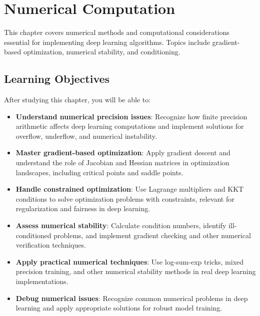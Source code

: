 
\chapter{Numerical Computation}
\label{chap:numerical-computation}

This chapter covers numerical methods and computational considerations essential for implementing deep learning algorithms. Topics include gradient-based optimization, numerical stability, and conditioning.

\section*{Learning Objectives}

After studying this chapter, you will be able to:

\begin{itemize}
    \item \textbf{Understand numerical precision issues}: Recognize how finite precision arithmetic affects deep learning computations and implement solutions for overflow, underflow, and numerical instability.
    
    \item \textbf{Master gradient-based optimization}: Apply gradient descent and understand the role of Jacobian and Hessian matrices in optimization landscapes, including critical points and saddle points.
    
    \item \textbf{Handle constrained optimization}: Use Lagrange multipliers and KKT conditions to solve optimization problems with constraints, relevant for regularization and fairness in deep learning.
    
    \item \textbf{Assess numerical stability}: Calculate condition numbers, identify ill-conditioned problems, and implement gradient checking and other numerical verification techniques.
    
    \item \textbf{Apply practical numerical techniques}: Use log-sum-exp tricks, mixed precision training, and other numerical stability methods in real deep learning implementations.
    
    \item \textbf{Debug numerical issues}: Recognize common numerical problems in deep learning and apply appropriate solutions for robust model training.
\end{itemize}








